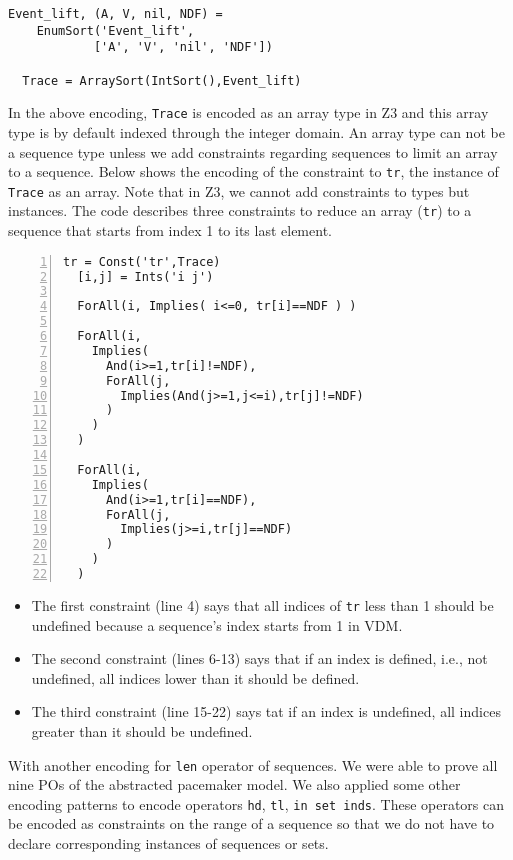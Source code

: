 \medskip
\begin{mdframed}[roundcorner=5pt,shadow=true]
\begin{Verbatim}[fontsize=\small]
  Event_lift, (A, V, nil, NDF) = 
    EnumSort('Event_lift', 
            ['A', 'V', 'nil', 'NDF'])

  Trace = ArraySort(IntSort(),Event_lift)
\end{Verbatim}
\end{mdframed}
\medskip

In the above encoding, {\tt Trace} is encoded as an array type in Z3 and this array type is by default indexed through the integer domain. An array type can not be a sequence type unless we add constraints regarding sequences to limit an array to a sequence. Below shows the encoding of the constraint to {\tt tr}, the instance of {\tt Trace} as an array. Note that in Z3, we cannot add constraints to types but instances. The code describes three constraints to reduce an array ({\tt tr}) to a sequence that starts from index 1 to its last element.

\medskip
\begin{mdframed}[roundcorner=5pt,shadow=true]
\begin{Verbatim}[fontsize=\small,numbers=left]
  tr = Const('tr',Trace)
  [i,j] = Ints('i j')

  ForAll(i, Implies( i<=0, tr[i]==NDF ) )

  ForAll(i,
    Implies(
      And(i>=1,tr[i]!=NDF),
      ForAll(j,
        Implies(And(j>=1,j<=i),tr[j]!=NDF)
      )
    )
  )

  ForAll(i,
    Implies(
      And(i>=1,tr[i]==NDF),
      ForAll(j,
        Implies(j>=i,tr[j]==NDF)
      )
    )
  )
\end{Verbatim}
\end{mdframed}
\medskip


\begin{itemize}
\item
The first constraint (line 4) says that all indices of {\tt tr} less than 1 should be undefined because a sequence's index starts from 1 in VDM.
\item
The second constraint (lines 6-13) says that if an index is defined, i.e., not undefined, all indices lower than it should be defined.
\item
The third constraint (line 15-22) says tat if an index is undefined, all indices greater than it should be undefined.
\end{itemize}

With another encoding for {\tt len} operator of sequences. We were able to prove all nine POs of the abstracted pacemaker model. We also applied some other encoding patterns to encode operators {\tt hd}, {\tt tl}, {\tt in set inds}. These operators can be encoded as constraints on the range of a sequence so that we do not have to declare corresponding instances of sequences or sets.

